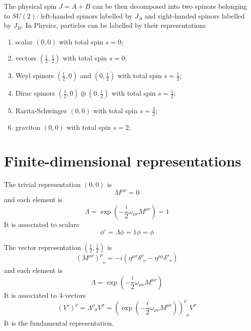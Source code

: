     The physical spin $J = A + B$ can be then decomposed into two spinors belonging to $SU(2)$: left-handed spinors labelled by $J_A$ and right-handed spinors labelled by $J_B$. In Physics, particles can be labelled by their representations 
    \begin{enumerate}
        \item scalar $(0,0)$ with total spin $s = 0$;
        \item vectors $(\frac{1}{2},\frac{1}{2})$ with total spin $s = 0$;
        \item Weyl spinors $(\frac{1}{2},0)$ and $(0, \frac{1}{2})$ with total spin $s = \frac{1}{2}$;
        \item Dirac spinors $(\frac{1}{2},0) \oplus (0, \frac{1}{2})$  with total spin $s = \frac{1}{2}$;
        \item Rarita-Schwinger $(0,0)$ with total spin $s = \frac{3}{2}$;
        \item graviton $(0,0)$ with total spin $s = 2$;
    \end{enumerate}

\section{Finite-dimensional representations}

    The trivial representation $(0,0)$ is 
    \begin{equation*}
        M^{\mu\nu} = 0
    \end{equation*}
    and each element is 
    \begin{equation*}
        \Lambda = \exp(-\frac{i}{2} \omega_{\mu\nu} M^{\mu\nu}) = 1
    \end{equation*}
    It is associated to scalars
    \begin{equation*}
        \phi' = \Lambda \phi = 1 \phi = \phi
    \end{equation*}

    The vector representation $(\frac{1}{2},\frac{1}{2})$ is 
    \begin{equation*}
        (M^{\rho\sigma})^{\mu}_{\phantom \mu \nu} = - i (\eta^{\mu\sigma} \delta^{\rho}_{\phantom \rho \nu} - \eta^{\rho \mu} \delta^{\sigma}_{\phantom \sigma \nu})
    \end{equation*}
    and each element is 
    \begin{equation*}
        \Lambda = \exp(-\frac{i}{2} \omega_{\mu\nu} M^{\mu\nu})
    \end{equation*}
    It is associated to 4-vectors
    \begin{equation*}
        (V')^\rho = \Lambda^{\rho}_{\phantom \rho \sigma} V^\sigma = (\exp(-\frac{i}{2} \omega_{\mu\nu} M^{\mu\nu}))^{\rho}_{\phantom \rho \sigma} V^\sigma
    \end{equation*}
    It is the fundamental representation.

